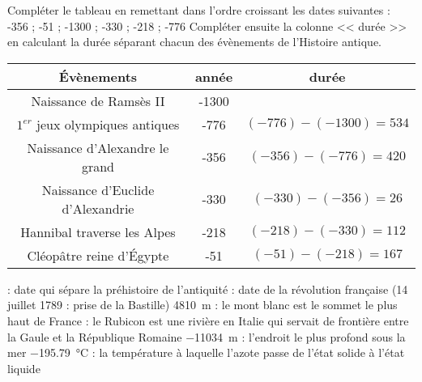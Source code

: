 \documentclass[../Cours.tex]{subfiles}
\begin{document}
\clearpage
\CORRECTIONS

\begin{questions}
    \exercice
    \exercice
    \exercice 
    
    \question Compléter le tableau en remettant dans l'ordre croissant les dates suivantes : \\-356 ; -51 ; -1300 ; -330 ; -218 ; -776
    \question Compléter ensuite la colonne << durée >> en calculant la durée séparant chacun des évènements de l'Histoire antique.
    \begin{center}
    \begin{tabular}{|c|c|c|}\hline
    Évènements & année & durée \\\hline
    Naissance de Ramsès II  & -1300 & \\\hline
    $1^{er}$ jeux olympiques antiques & -776 & $(-776)-(-1300)=534$ \\\hline
    Naissance d'Alexandre le grand & -356 & $(-356)-(-776)=420$\\\hline
    Naissance d'Euclide d'Alexandrie & -330 & $(-330)-(-356)=26$ \\\hline
    Hannibal traverse les Alpes & -218 & $(-218)-(-330)=112$\\\hline
    Cléopâtre reine d'Égypte & -51 & $(-51)-(-218)=167$ \\\hline
    \end{tabular}
    \end{center}

     : date qui sépare la préhistoire de l'antiquité
     : date de la révolution française (14 juillet 1789 : prise de la Bastille)
    \question \qty{4810}{\metre} : le mont blanc est le sommet le plus haut de France
     : le Rubicon est une rivière en Italie qui servait de frontière entre la Gaule et la République Romaine
    \question \qty{-11034}{\metre} : l'endroit le plus profond sous la mer
    \question \qty{-195.79}{\degreeCelsius} : la température à laquelle l'azote passe de l'état solide à l'état liquide
\end{questions}
\end{document}
